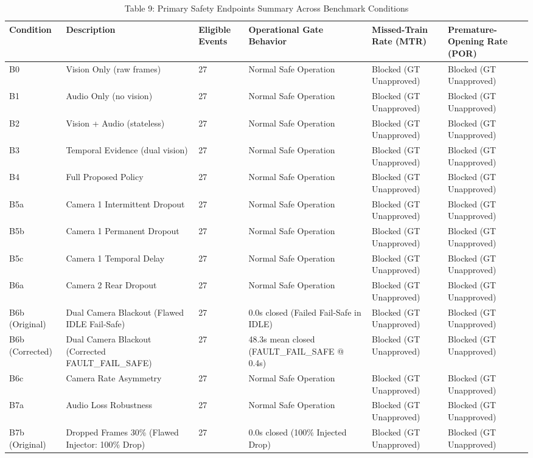 \begin{table}[t]
\centering
\caption{Table 9: Primary Safety Endpoints Summary Across Benchmark Conditions}
\label{tab:table09_primary_safety_endpoints}
\begin{tabular}{llllll}
\hline
Condition & Description & Eligible Events & Operational Gate Behavior & Missed-Train Rate (MTR) & Premature-Opening Rate (POR) \\
\hline
B0 & Vision Only (raw frames) & 27 & Normal Safe Operation & Blocked (GT Unapproved) & Blocked (GT Unapproved) \\
B1 & Audio Only (no vision) & 27 & Normal Safe Operation & Blocked (GT Unapproved) & Blocked (GT Unapproved) \\
B2 & Vision + Audio (stateless) & 27 & Normal Safe Operation & Blocked (GT Unapproved) & Blocked (GT Unapproved) \\
B3 & Temporal Evidence (dual vision) & 27 & Normal Safe Operation & Blocked (GT Unapproved) & Blocked (GT Unapproved) \\
B4 & Full Proposed Policy & 27 & Normal Safe Operation & Blocked (GT Unapproved) & Blocked (GT Unapproved) \\
B5a & Camera 1 Intermittent Dropout & 27 & Normal Safe Operation & Blocked (GT Unapproved) & Blocked (GT Unapproved) \\
B5b & Camera 1 Permanent Dropout & 27 & Normal Safe Operation & Blocked (GT Unapproved) & Blocked (GT Unapproved) \\
B5c & Camera 1 Temporal Delay & 27 & Normal Safe Operation & Blocked (GT Unapproved) & Blocked (GT Unapproved) \\
B6a & Camera 2 Rear Dropout & 27 & Normal Safe Operation & Blocked (GT Unapproved) & Blocked (GT Unapproved) \\
B6b (Original) & Dual Camera Blackout (Flawed IDLE Fail-Safe) & 27 & 0.0s closed (Failed Fail-Safe in IDLE) & Blocked (GT Unapproved) & Blocked (GT Unapproved) \\
B6b (Corrected) & Dual Camera Blackout (Corrected FAULT\_FAIL\_SAFE) & 27 & 48.3s mean closed (FAULT\_FAIL\_SAFE @ 0.4s) & Blocked (GT Unapproved) & Blocked (GT Unapproved) \\
B6c & Camera Rate Asymmetry & 27 & Normal Safe Operation & Blocked (GT Unapproved) & Blocked (GT Unapproved) \\
B7a & Audio Loss Robustness & 27 & Normal Safe Operation & Blocked (GT Unapproved) & Blocked (GT Unapproved) \\
B7b (Original) & Dropped Frames 30\% (Flawed Injector: 100\% Drop) & 27 & 0.0s closed (100\% Injected Drop) & Blocked (GT Unapproved) & Blocked (GT Unapproved) \\

\end{tabular}
\end{table}
